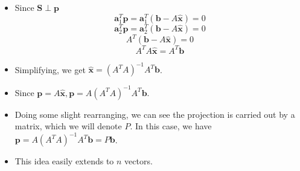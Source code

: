 \documentclass[11pt]{article}
\begin{document}
\begin{itemize}
    \item Since $\boldsymbol{S} \perp \boldsymbol{p}$
    \[ \boldsymbol{a}_1^T \boldsymbol{p} = \boldsymbol{a}_1^T (\boldsymbol{b} - A
    \boldsymbol{\hat{x}}) = 0 \]
    \[ \boldsymbol{a}_2^T \boldsymbol{p} = \boldsymbol{a}_2^T (\boldsymbol{b} - A
    \boldsymbol{\hat{x}}) = 0 \]
    \[ A^T(\boldsymbol{b} - A\boldsymbol{\hat{x}}) = 0\]
    \[ A^T A\boldsymbol{\hat{x}} = A^T \boldsymbol{b}\]
    \item Simplifying, we get $\boldsymbol{\hat{x}} = {(A^T A)}^{-1} A^T \boldsymbol{b}$.
    \item Since $\boldsymbol{p} = A\boldsymbol{\hat{x}}, \boldsymbol{p} = A{(A^T A)}^{-1} A^T 
    \boldsymbol{b}$.
    \item Doing some slight rearranging, we can see the projection is carried out by a matrix,
    which we will denote $P$. In this case, we have $\boldsymbol{p} = A{(A^T A)}^{-1} A^T 
    \boldsymbol{b} = P\boldsymbol{b}$.
    \item This idea easily extends to $n$ vectors.

\end{itemize}
\end{document}
